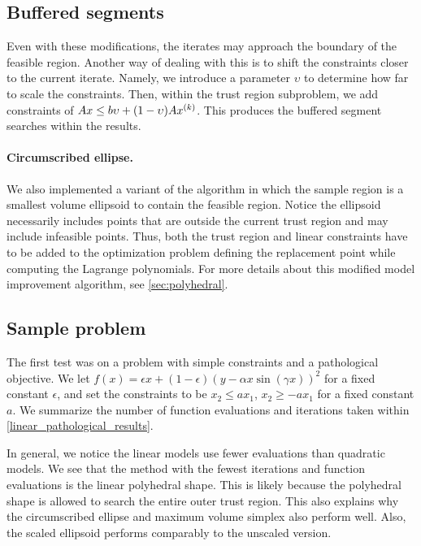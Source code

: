 

\subsection{Buffered segments}

Even with these modifications, the iterates may approach the boundary of the feasible region.
Another way of dealing with this is to shift the constraints closer to the current iterate.
Namely, we introduce a parameter $\upsilon$ to determine how far to scale the constraints.
Then, within the trust region subproblem, we add constraints of $Ax \le b\upsilon + (1-\upsilon) A x^{(k)} $.
This produces the buffered segment searches within the results.

\paragraph*{Circumscribed ellipse.}

We also implemented a variant of the algorithm in which the sample region is a smallest volume ellipsoid to contain the feasible region.
Notice the ellipsoid necessarily includes points that are outside the current trust region and may include infeasible points.
Thus, both the trust region and linear constraints have to be added to the optimization problem defining the replacement point while computing the Lagrange polynomials.
For more details about this modified model improvement algorithm, see \cref{sec:polyhedral}.

\subsection{Sample problem}

The first test was on a problem with simple constraints and a pathological objective.
We let $f(x) = \epsilon x + (1-\epsilon)(y - \alpha x \sin(\gamma x))^2$ for a fixed constant $\epsilon$, and set the constraints to be
$x_2 \le ax_1$, $x_2 \ge -ax_1$ for a fixed constant $a$.
We summarize the number of function evaluations and iterations taken within \cref{linear_pathological_results}.

In general, we notice the linear models use fewer evaluations than quadratic models.
We see that the method with the fewest iterations and function evaluations is the linear polyhedral shape.
This is likely because the polyhedral shape is allowed to search the entire outer trust region.
This also explains why the circumscribed ellipse and maximum volume simplex also perform well.
Also, the scaled ellipsoid performs comparably to the unscaled version.

